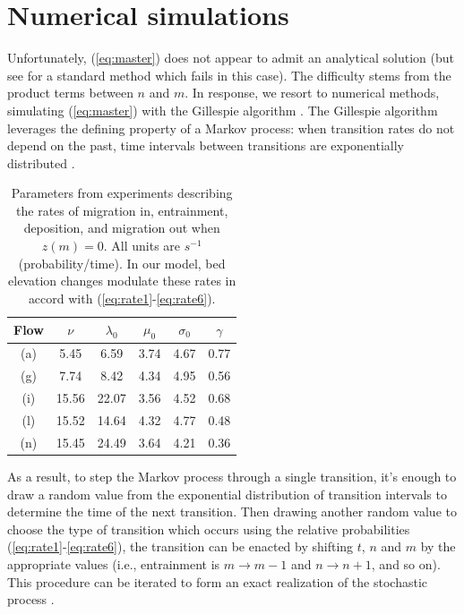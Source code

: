 \documentclass[draft]{agujournal2018}
\begin{document}
\section{Numerical simulations}

Unfortunately, (\ref{eq:master}) does not appear to admit an analytical solution (but see \citet{Swift2002} for a standard method which fails in this case).
The difficulty stems from the product terms between $n$ and $m$.
In response, we resort to numerical methods, simulating (\ref{eq:master}) with the Gillespie algorithm \citep{Gillespie1977, Gillespie1992, Gillespie2007}.
The Gillespie algorithm leverages the defining property of a Markov process: when transition rates do not depend on the past, time intervals between transitions are exponentially distributed \citep[e.g.][]{Cox1965}.



\begin{table}
	\caption{Parameters from \citet{Ancey2008} experiments describing the rates of migration in, entrainment, deposition, and migration out when $z(m)=0$. All units are $s^{-1}$ (probability/time). In our model, bed elevation changes modulate these rates in accord with (\ref{eq:rate1}-\ref{eq:rate6}).}\label{tab:anceyparams}
	\begin{tabular}{cccccc} \\ 
		\toprule  
		Flow & $\nu$ & $\lambda_0$ & $\mu_0$ & $\sigma_0$ & $\gamma$ \\
		\midrule
		(a) & 5.45  & 6.59  & 3.74 & 4.67 & 0.77 \\
		\midrule
		(g) & 7.74  & 8.42  & 4.34 & 4.95 & 0.56 \\
		\midrule
		(i) & 15.56 & 22.07 & 3.56 & 4.52 & 0.68 \\
		\midrule
		(l) & 15.52 & 14.64 & 4.32 & 4.77 & 0.48 \\
		\midrule
		(n) & 15.45 & 24.49 & 3.64 & 4.21 & 0.36 \\
		\bottomrule
	\end{tabular}
\end{table} 

As a result, to step the Markov process through a single transition, it's enough to draw a random value from the exponential distribution of transition intervals to determine the time of the next transition.
Then drawing another random value to choose the type of transition which occurs using the relative probabilities (\ref{eq:rate1}-\ref{eq:rate6}), the transition can be enacted by shifting $t$, $n$ and $m$ by the appropriate values (i.e., entrainment is $m\rightarrow m-1$ and $n \rightarrow n+1$, and so on).
This procedure can be iterated to form an exact realization of the stochastic process \citep[e.g.][]{Gillespie2007}.
\end{document}
